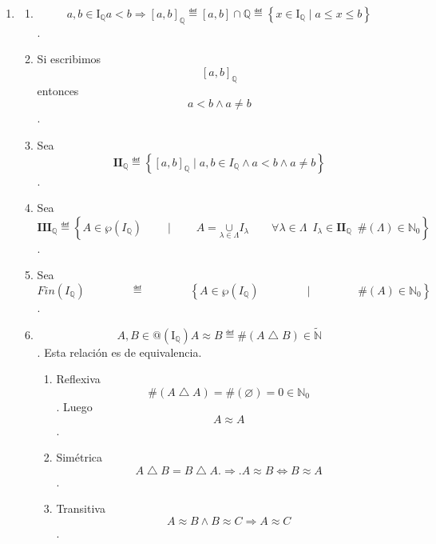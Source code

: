 \begin{enumerate}
  \begin{enumerate}
  \def\labelenumii{\arabic{enumii}.}
  \item
    \begin{enumerate}
    \def\labelenumiii{\arabic{enumiii}.}
    \item
      \[a,{b \in \mathbf{\mathrm{I}}_{\mathbb{Q}}}{a < b}\Rightarrow\left\lbrack {a,b} \right\rbrack_{\mathbb{Q}} ≝ {\left\lbrack {a,b} \right\rbrack \cap \mathbb{Q}} ≝ \left\{ {{x \in \mathbf{\mathrm{I}}_{\mathbb{Q}}} \mid {{a \leq x} \leq b}} \right\}\].
    \item
      Si escribimos \[\left\lbrack {a,b} \right\rbrack_{\mathbb{Q}}\]
      entonces \[{a < {b \land a}} \neq b\].
    \item
      Sea
      \[\mathbf{II}_{\mathbb{Q}} ≝ \left\{ {\left\lbrack {a,b} \right\rbrack_{\mathbb{Q}} \mid {a,{{{b \in {I_{\mathbb{Q}} \land a}} < {b \land a}} \neq b}}} \right\}\].
    \item
      Sea
      \[\mathbf{III}_{\mathbb{Q}}≝\left\{ {{A \in {\wp\left( I_{\mathbb{Q}} \right)}}\qquad \mid \qquad{{A = \underset{\lambda \in \Lambda}{\mathbf{\cup}}}I_{\lambda}\qquad\forall{\lambda \in \Lambda}\mspace{9mu}{I_{\lambda} \in {\mathbf{II}_{\mathbb{Q}}\mspace{9mu}{{\#(\Lambda)} \in {\mathbb{N}}_{0}}}}}} \right\}\]
      .
    \item
      Sea
      \[\mathit{Fin}\left( I_{\mathbb{Q}} \right)\mspace{72mu} ≝\mspace{72mu}\left\{ {{A \in \wp}\left( I_{\mathbb{Q}} \right)\mspace{72mu} \mid \mspace{72mu}\#{(A) \in {\mathbb{N}}_{0}}} \right\}\].
    \item
      \[A,B{\in}{@\left( \mathbf{\mathrm{I}}_{\mathbb{Q}} \right)}{A \approx B} ≝ {\#{\left( {A \bigtriangleup B} \right) \in \widetilde{\mathbb{N}}}}\].
      Esta relación es de equivalencia.

      \begin{enumerate}
      \def\labelenumiv{\arabic{enumiv}.}
      \item
        Reflexiva
        \[\#{\left( {A\bigtriangleup A} \right) = \#}{(\varnothing) = 0 \in {\mathbb{N}}_{0}}\].
        Luego \[A \approx A\].
      \item
        Simétrica
        \[A \bigtriangleup {B = B} \bigtriangleup A.\Rightarrow.A \approx B\Leftrightarrow B \approx A\].
      \item
        Transitiva
        \[A \approx {B \land B} \approx C\Rightarrow A \approx C\].


\end{enumerate}
\end{enumerate}
\end{enumerate}
\end{enumerate}
